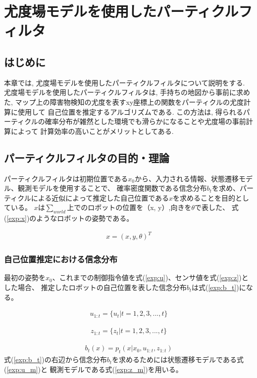 \chapter{尤度場モデルを使用したパーティクルフィルタ}
\section{はじめに}
本章では, 尤度場モデルを使用したパーティクルフィルタについて説明をする. 
尤度場モデルを使用したパーティクルフィルタは, 手持ちの地図から事前に求めた, 
マップ上の障害物検知の尤度を表すxy座標上の関数をパーティクルの尤度計算に使用して
自己位置を推定するアルゴリズムである. 
この方法は, 得られるパーティクルの確率分布が雑然とした環境でも滑らかになることや尤度場の事前計算によって
計算効率の高いことがメリットとしてある. 

\section{パーティクルフィルタの目的・理論}

パーティクルフィルタは初期位置である$x_0$から、入力される情報、状態遷移モデル、観測モデルを使用することで、
確率密度関数である信念分布$b_t$を求め、パーティクルによる近似によって推定した自己位置である$x$を求めることを目的としている。
$x$は$\sum_{world}$上でのロボットの位置を（x, y）,向きを$\theta$で表した、
式(\ref{exp:x})のようなロボットの姿勢である。

\begin{eqnarray}
  \label{exp:x}
  x = (x, y ,\theta)^T
\end{eqnarray}

\subsection{自己位置推定における信念分布}

最初の姿勢を$x_0$、これまでの制御指令値を式(\ref{exp:u})、センサ値を式(\ref{exp:z})とした場合、
推定したロボットの自己位置を表した信念分布$b_t$は式(\ref{exp:b_t})になる。

\begin{eqnarray}
  \label{exp:u}
  u_{1:t} = \{u_t|t=1,2,3,...,t\} 
\end{eqnarray}

\begin{eqnarray}
  \label{exp:z}
  z_{1:t} = \{z_t|t=1,2,3,...,t\} 
\end{eqnarray}

\begin{eqnarray}
  \label{exp:b_t}
  b_t(x) = p_t(x|x_0, u_{1:t}, z_{1:t}) 
\end{eqnarray}
式(\ref{exp:b_t})の右辺から信念分布$b_t$を求めるためには状態遷移モデルである式(\ref{exp:u_m})と
観測モデルである式(\ref{exp:z_m})を用いる。

